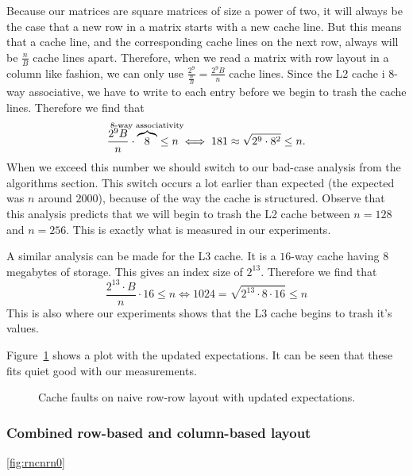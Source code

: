 Because our matrices are square matrices of size a power of two, it
will always be the case that a new row in a matrix starts with a new
cache line. But this means that a cache line, and the corresponding
cache lines on the next row, always will be $\frac{n}{B}$ cache lines
apart. Therefore, when we read a matrix with row layout in a column
like fashion, we can only use $\frac{2^9}{\frac{n}{B}} =
\frac{2^9B}{n}$ cache lines. Since the L2 cache i 8-way associative,
we have to write to each entry before we begin to trash the cache
lines. Therefore we find that
\[
\frac{2^9 B}{n} \cdot \overbrace{8}^{\mathclap{\text{8-way associativity}}} \leq n
\iff
181 \approx \sqrt{2^9 \cdot 8^2} \leq n.
\]
When we exceed this number we should switch to our bad-case analysis
from the algorithms section. This switch occurs a lot earlier than
expected (the expected was $n$ around $2000$), because of the way the
cache is structured. Observe that this analysis predicts that we will
begin to trash the L2 cache between $n = 128$ and $n = 256$. This is
exactly what is measured in our experiments.

A similar analysis can be made for the L3 cache. It is a $16$-way
cache having $8$ megabytes of storage. This gives an index size of
$2^{13}$. Therefore we find that
\[
\frac{2^{13} \cdot B}{n} \cdot 16 \leq n \iff 1024 = \sqrt{2^{13} \cdot 8 \cdot 16} \leq n
\]
This is also where our experiments shows that the L3 cache begins to
trash it's values.

Figure~\ref{fig:rowrowfixed} shows a plot with the updated
expectations. It can be seen that these fits quiet good with our
measurements.
\begin{figure}[h!]
  \centering
  \caption{Cache faults on naive row-row layout with updated
    expectations.}
  \label{fig:rowrowfixed}
\end{figure}

\subsubsection{Combined row-based and column-based layout}

\ref{fig:rncnrn0}

